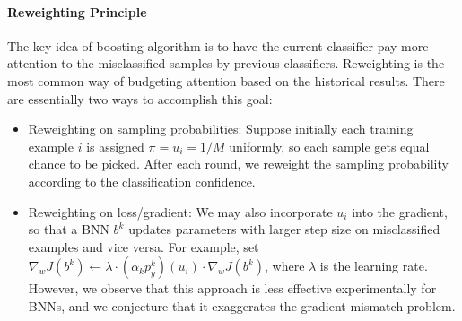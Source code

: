 \documentclass[10pt,twocolumn,letterpaper]{article}
\begin{document}
% 
\vspace{-4mm}
\paragraph{Reweighting Principle}
The key idea of boosting algorithm is to have the current classifier pay more attention to the misclassified samples by previous classifiers. Reweighting is the most common way of budgeting attention based on the historical results. There are essentially two ways to accomplish this goal:
\begin{itemize}[leftmargin=0.5cm]
    \item Reweighting on sampling probabilities: Suppose initially each training example $i$ is assigned $\pi = u_{i} = 1/M$ uniformly, so each sample gets equal chance to be picked. After each round, we reweight the sampling probability according to the classification confidence.
    \item Reweighting on loss/gradient: We may also incorporate $u_{i}$ into the gradient, so that a BNN $b^{k}$ updates parameters with larger step size on misclassified examples and vice versa. For example, set $\nabla_{w}J(b^{k}) \leftarrow \lambda \cdot  (\alpha_{k}p^{k}_{y})(u_{i}) \cdot \nabla_{w}J(b^{k})$, where $\lambda$ is the learning rate. However, we observe that this approach is less effective experimentally for BNNs, and we conjecture that it exaggerates the gradient mismatch problem.
\end{itemize}

\end{document}
